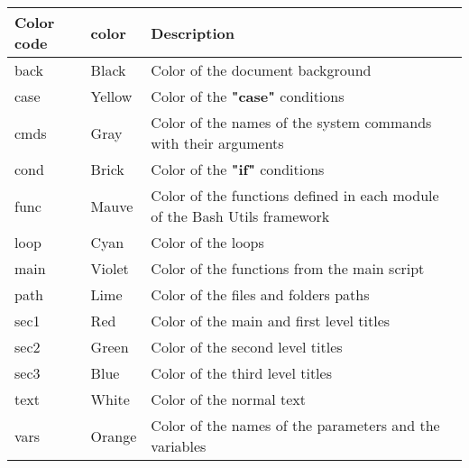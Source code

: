 \documentclass[a4paper,10pt]{article}
\begin{document}
\begin{justify}
    \begin{tabular}{|l|l|l|}
        \hline
        \textbf{Color code} & \textbf{color}        & \textbf{Description}\\
        \hline
        \color{text}back    & \color{text}Black     & \color{text}Color of the document background\\
        \hline
        \color{case}case    & \color{case}Yellow    & \color{case}Color of the \textbf{"case"} conditions\\
        \hline
        \color{cmds}cmds    & \color{cmds}Gray      & \color{cmds}Color of the names of the system commands with their arguments\\
        \hline
        \color{cond}cond    & \color{cond}Brick     & \color{cond}Color of the \textbf{"if"} conditions\\
        \hline
        \color{func}func    & \color{func}Mauve     & \color{func}Color of the functions defined in each module of the Bash Utils framework\\
        \hline
        \color{loop}loop    & \color{loop}Cyan      & \color{loop}Color of the loops\\
        \hline
        \color{main}main    & \color{main}Violet    & \color{main}Color of the functions from the main script\\
        \hline
        \color{path}path    & \color{path}Lime      & \color{path}Color of the files and folders paths\\
        \hline
        \color{sec1}sec1    & \color{sec1}Red       & \color{sec1}Color of the main and first level titles\\
        \hline
        \color{sec2}sec2    & \color{sec2}Green     & \color{sec2}Color of the second level titles\\
        \hline
        \color{sec3}sec3    & \color{sec3}Blue      & \color{sec3}Color of the third level titles\\
        \hline
        \color{text}text    & \color{text}White     & \color{text}Color of the normal text\\
        \hline
        \color{vars}vars    & \color{vars}Orange    & \color{vars}Color of the names of the parameters and the variables\\
        \hline

    \end{tabular}
\end{justify}

\newpage
\end{document}
